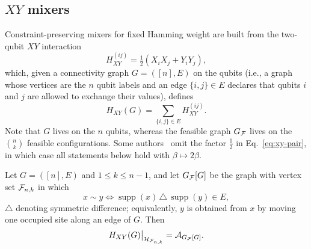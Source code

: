 \subsection{\label{subsec:xy}$XY$ mixers}

Constraint-preserving mixers for fixed Hamming weight are built from the
two-qubit $XY$ interaction~\cite{Wang2020}
\begin{equation}
    H^{(ij)}_{XY}
    =
    \tfrac{1}{2}\left(X_iX_j+Y_iY_j\right),
    \label{eq:xy-pair}
\end{equation}
which, given a connectivity graph $G=([n],E)$ on the qubits (i.e., a graph whose vertices are the $n$ qubit
labels and an edge $\{i,j\}\in E$ declares that qubits $i$
and $j$ are allowed to exchange their values), defines
\begin{equation}
    H_{XY}(G)
    =
    \sum_{\{i,j\}\in E}
    H^{(ij)}_{XY} .
    \label{eq:xy-mixer}
\end{equation}
Note that $G$ lives on the $n$ qubits, whereas the feasible graph $G_{\mathcal{F}}$ lives
on the $\binom{n}{k}$ feasible configurations. Some
authors~\cite{Wang2020,Matwiejew2024} omit the factor $\tfrac12$ in
Eq.~\eqref{eq:xy-pair}, in which case all statements below hold with
$\beta\mapsto2\beta$.

\begin{proposition}
\label{prop:xy-hopping}
Let $G=([n],E)$ and $1\le k\le n-1$, and let $G_{\mathcal{F}}[G]$ be the graph with
vertex set $\mathcal{F}_{n,k}$ in which
\begin{equation}
    x\sim y
    \iff
    \operatorname{supp}(x)\,\triangle\,\operatorname{supp}(y)\in E ,
    \label{eq:induced-adjacency}
\end{equation}
$\triangle$ denoting symmetric difference; equivalently, $y$ is obtained from
$x$ by moving one occupied site along an edge of $G$. Then
\begin{equation}
    H_{XY}(G)\big|_{\mathcal{H}_{\mathcal{F}_{n,k}}}
    =
    \mathcal{A}_{G_{\mathcal{F}}[G]} .
    \label{eq:xy-hopping}
\end{equation}
\end{proposition}

